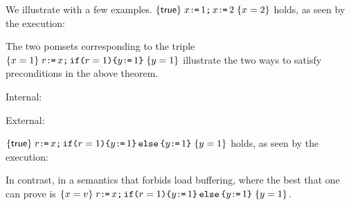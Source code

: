 

We illustrate with a few examples.
$\hoare{\TRUE}{x\GETS 1 \SEMI x \GETS 2}{x=2} $ holds, as seen by the execution:
\begin{tikzdisplay}[node distance=1em]
\end{tikzdisplay}

The two pomsets corresponding to the triple $\hoare{x=1}{r \GETS x \SEMI \IF{r=1} \THEN y \GETS 1\FI}{y=1}$ illustrate the two ways to satisfy preconditions in the above theorem.
\begin{displaymathsmall}
\mbox{Internal: }
\begin{tikzcenter}
\end{tikzcenter}
\qquad \qquad
\mbox{External: }
\begin{tikzcenter}
\end{tikzcenter}
\end{displaymathsmall}

$\hoare{\TRUE}{r \GETS x \SEMI \IF{r=1} \THEN y \GETS 1 \ELSE y \GETS 1 \FI}{y=1} $ holds, as seen by the execution:
\begin{tikzdisplay}[node distance=1em]
\end{tikzdisplay}
In contrast, in a semantics that forbids load buffering, where the best that one can prove is
$\hoare{x=v} {r \GETS x \SEMI \IF{r=1} \THEN y \GETS 1 \ELSE y \GETS 1 \FI}{y= 1}
$.

